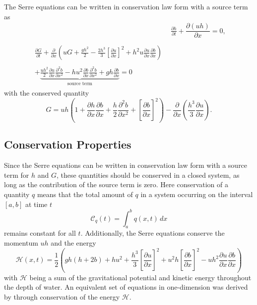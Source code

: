 \documentclass[times]{elsarticle}
\begin{document}
The Serre equations can be written in conservation law form with a source term \cite{Zoppou-etal-2017} as
\begin{subequations}
	\label{eqn:FullSerreCon}
	\begin{align}
	& \frac{\partial h}{\partial t} + \dfrac{\partial (uh)}{\partial x} = 0 ,\label{eqn:FullSerreConMass}  \\ \nonumber \\
	\begin{split}
	\label{eqn:Serreconsconmom}
	\frac{\partial G}{\partial t}  + \frac{\partial}{\partial x} \left( {u} G + \frac{gh^2}{2} - \frac{2h^3}{3} \left[\frac{\partial {u}}{\partial x}\right]^2 + h^2 {u}\frac{\partial {u}}{\partial x}\frac{\partial b}{\partial x} \right) \\ \\ +  \underbrace{\frac{uh^2}{2} \frac{\partial {u}}{\partial x} \frac{\partial^2 b}{\partial x^2}  - h {u}^2\frac{\partial b}{\partial x}\frac{\partial^2 b}{\partial x^2} + gh\frac{\partial b}{\partial x} } _{\text{source term}} = 0
	\end{split}
	\end{align}
\end{subequations}
with the conserved quantity
\begin{equation}
\label{defn:SerreEqnConservedQuantity1}
G =  {u}h \left(1 + \frac{\partial h}{\partial x}\frac{\partial b}{\partial x} + \frac{h}{2}\frac{\partial^2 b}{\partial x^2} + \left[\frac{\partial b}{\partial x}\right]^2 \right) - \frac{\partial}{\partial x}\left(\frac{h^3}{3}  \frac{\partial {u}}{\partial x}\right).
\end{equation}

\subsection{Conservation Properties}
Since the Serre equations can be written in conservation law form with a source term for $h$ and $G$, these quantities should be conserved in a closed system, as long as the contribution of the source term is zero. Here conservation of a quantity $q$ means that the total amount of $q$ in a system occurring on the interval $[a,b]$ at time $t$
\begin{equation*}
\mathcal{C}_q(t) = \int_{a}^{b} q(x,t)\, dx
\end{equation*}
remains constant for all $t$. Additionally, the Serre equations conserve the momentum $uh$ and the energy
\begin{equation*}
\mathcal{H}(x,t) = \frac{1}{2} \left( gh\left(h + 2b\right) + hu^2  + \frac{h^3}{3} \left[\frac{\partial u}{\partial x}\right]^2 + u^2h\left[\frac{\partial b}{\partial x}\right]^2 - uh^2 \frac{\partial u}{\partial x} \frac{\partial b}{\partial x}  \right)
\label{eqn:Hamildef}
\end{equation*}
with $\mathcal{H}$ being a sum of the gravitational potential and kinetic energy throughout the depth of water. An equivalent set of equations in one-dimension was derived by \citet{Green-Naghdi-1976-237} through conservation of the energy $\mathcal{H}$. 
\end{document}
